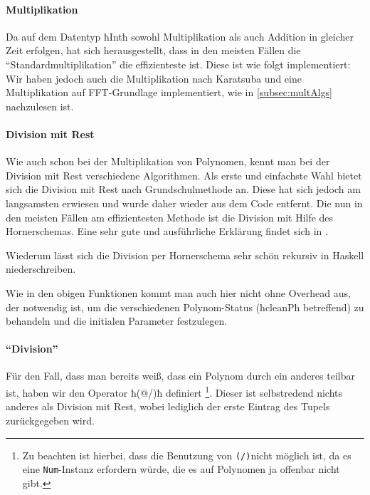 \paragraph{Multiplikation}
Da auf dem Datentyp ħIntħ sowohl Multiplikation als auch Addition in gleicher
Zeit erfolgen, hat sich herausgestellt, dass in den meisten Fällen die 
"`Standardmultiplikation"' die effizienteste ist. Diese ist wie folgt
implementiert:
Wir haben jedoch auch die Multiplikation nach Karatsuba und eine Multiplikation
auf FFT-Grundlage implementiert, wie in \autoref{subsec:multAlgs} nachzulesen ist.

\paragraph{Division mit Rest}
Wie auch schon bei der Multiplikation von Polynomen, kennt man bei der Division
mit Rest verschiedene Algorithmen. Als erste und einfachste Wahl bietet sich
die Division mit Rest nach Grundschulmethode an. Diese hat sich jedoch am
langsamsten erwiesen und wurde daher wieder aus dem Code entfernt. Die nun in
den meisten Fällen am effizientesten Methode ist die Division mit Hilfe des
Hornerschemas. Eine sehr gute und ausführliche Erklärung findet sich 
in \autocite{wiki:synthetic-division}.

\begin{beispiel}
  
\end{beispiel}

Wiederum lässt sich die Division per Hornerschema sehr schön rekursiv in
Haskell niederschreiben.

Wie in den obigen Funktionen kommt man auch hier nicht ohne Overhead aus, der
notwendig ist, um die verschiedenen Polynom-Status (ħcleanPħ betreffend) zu
behandeln und die initialen Parameter festzulegen.

\paragraph{"`Division"'} Für den Fall, dass man bereits weiß, dass ein
Polynom durch ein anderes teilbar ist, haben wir den Operator ħ(@/)ħ definiert
\footnote{Zu beachten ist hierbei, dass die Benutzung 
von \lstinline{(/)}nicht möglich 
ist, da es eine \lstinline{Num}-Instanz erfordern würde, die es auf Polynomen ja
offenbar nicht gibt.}.
Dieser ist selbstredend nichts anderes als Division mit Rest, wobei lediglich
der erste Eintrag des Tupels zurückgegeben wird.







